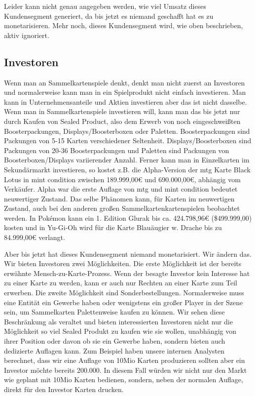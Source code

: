 \documentclass[fontsize=12, a4aper]{scrartcl}
\begin{document}
\noindent Leider kann nicht genau angegeben werden, wie viel Umsatz dieses Kundensegment generiert, da bis jetzt es niemand geschafft hat es zu monetarisieren. Mehr noch, dieses Kundensegment wird, wie oben beschrieben, aktiv ignoriert.


\subsection{Investoren} \label{subsec:Investoren}

Wenn man an Sammelkartenspiele denkt, denkt man nicht zuerst an Investoren und normalerweise kann man in ein Spielprodukt nicht einfach investieren. Man kann in Unternehmensanteile und Aktien investieren aber das ist nicht dasselbe. Wenn man in Sammelkartenspiele investieren will, kann man das bis jetzt nur durch Kaufen von \glqq Sealed Product\grqq{}, also dem Erwerb von noch eingeschweißten Boosterpackungen, Displays/Boosterboxen oder Paletten. Boosterpackungen sind Packungen von 5-15 Karten verschiedener Seltenheit. Displays/Boosterboxen sind Packungen von 20-36 Boosterpackungen und Paletten sind Packungen von Boosterboxen/Displays variierender Anzahl. Ferner kann man in Einzelkarten im Sekundärmarkt investieren, so kostet z.B. die Alpha-Version der \ac{mtg} Karte \glqq Black Lotus\grqq{} in \glqq mint condition \grqq{} zwischen 189.999,00€ und 690.000,00€, abhängig vom Verkäufer. Alpha war die erste Auflage von \acl{mtg} und \glqq mint condition\grqq{} bedeutet \glqq neuwertiger Zustand\grqq. Das selbe Phänomen kann, für Karten im neuwertigen Zustand, auch bei den anderen großen Sammelkartenkartenspielen beobachtet werden. In Pok\'emon kann ein 1. Edition \glqq Glurak\grqq{} bis ca. 424.798,96€ (\$499.999,00) kosten und in Yu-Gi-Oh wird für die Karte \glqq Blauäugier w. Drache\grqq{} bis zu 84.999,00€ verlangt.\hfill\newline

\noindent Aber bis jetzt hat dieses Kundensegment niemand monetarisiert. Wir ändern das. Wir bieten Investoren zwei Möglichkeiten. Die erste Möglichkeit ist der bereits erwähnte \glqq Mensch-zu-Karte-Prozess\grqq. Wenn der besagte Investor kein Interesse hat zu einer Karte zu werden, kann er auch nur Rechten an einer Karte zum Teil erwerben. Die zweite Möglichkeit sind Sonderbestellungen. Normalerweise muss eine Entität ein Gewerbe haben oder wenigstens ein großer Player in der Szene sein, um Sammelkarten Palettenweise kaufen zu können. Wir sehen diese Beschränkung als veraltet und bieten interessierten Investoren nicht nur die Möglichkeit so viel Sealed Produkt zu kaufen wie sie wollen, unabhängig von ihrer Position oder davon ob sie ein Gewerbe haben, sondern bieten auch dedizierte Auflagen kann. Zum Beispiel haben unsere internen Analysten berechnet, dass wir eine Auflage von 10Mio Karten produzieren sollten aber ein Investor möchte bereits 200.000. In diesem Fall würden wir nicht nur den Markt wie geplant mit 10Mio Karten bedienen, sondern, neben der normalen Auflage, direkt für den Investor Karten drucken.\hfill\newline
\end{document}
